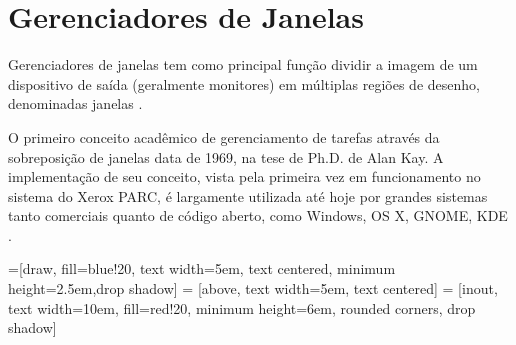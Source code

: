 \section{Gerenciadores de Janelas}

Gerenciadores de janelas tem como principal função dividir a imagem de um
dispositivo de saída (geralmente monitores) em múltiplas regiões de desenho,
denominadas janelas \cite[p. 5]{myers1996uimss}.

O primeiro conceito acadêmico de gerenciamento de tarefas através da
sobreposição de janelas data de 1969, na tese de Ph.D. de Alan Kay. A
implementação de seu conceito, vista pela primeira vez em funcionamento no
sistema do Xerox PARC, é largamente utilizada até hoje por grandes sistemas
tanto comerciais quanto de código aberto, como Windows, OS X, GNOME, KDE
\cite[p. 7]{myers2000past}.

=[draw, fill=blue!20, text width=5em,
    text centered, minimum height=2.5em,drop shadow]
 = [above, text width=5em, text centered]
 = [inout, text width=10em, fill=red!20,
    minimum height=6em, rounded corners, drop shadow]

\def\blockdist{2.3}
\def\edgedist{2.5}

